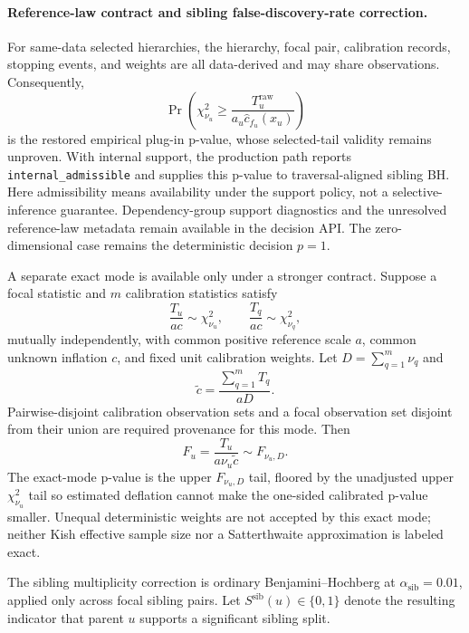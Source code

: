 \paragraph{Reference-law contract and sibling false-discovery-rate correction.}
For same-data selected hierarchies, the hierarchy, focal pair, calibration
records, stopping events, and weights are all data-derived and may share
observations. Consequently,
\begin{equation}
\Pr\!\left(
\chi^2_{\nu_u}
\ge
\frac{T_u^{\mathrm{raw}}}{a_u\hat c_{f_u}(x_u)}
\right)
\end{equation}
is the restored empirical plug-in p-value, whose selected-tail validity remains
unproven. With internal support, the production path reports
\texttt{internal\_admissible} and supplies this p-value to traversal-aligned
sibling BH. Here admissibility means availability under the support policy,
not a selective-inference guarantee. Dependency-group support diagnostics
and the unresolved reference-law metadata remain available in the decision API.
The zero-dimensional case remains the deterministic decision $p=1$.

A separate exact mode is available only under a stronger contract. Suppose a
focal statistic and $m$ calibration statistics satisfy
\[
\frac{T_u}{ac}\sim\chi^2_{\nu_u},
\qquad
\frac{T_q}{ac}\sim\chi^2_{\nu_q},
\]
mutually independently, with common positive reference scale $a$, common
unknown inflation $c$, and fixed unit calibration weights. Let
$D=\sum_{q=1}^m\nu_q$ and
\[
\widetilde c=\frac{\sum_{q=1}^m T_q}{aD}.
\]
Pairwise-disjoint calibration observation sets and a focal observation set
disjoint from their union are required provenance for this mode. Then
\[
F_u=\frac{T_u}{a\nu_u\widetilde c}\sim F_{\nu_u,D}.
\]
The exact-mode p-value is the upper $F_{\nu_u,D}$ tail, floored by the
unadjusted upper $\chi^2_{\nu_u}$ tail so estimated deflation cannot make the
one-sided calibrated p-value smaller. Unequal deterministic weights are not
accepted by this exact mode; neither Kish effective sample size nor a
Satterthwaite approximation is labeled exact.

The sibling multiplicity correction is ordinary
Benjamini--Hochberg \citep{benjamini1995controlling} at
$\alpha_{\mathrm{sib}} = 0.01$, applied only across focal sibling pairs. Let
$S^{\mathrm{sib}}(u) \in \{0,1\}$ denote the resulting indicator that parent
$u$ supports a significant sibling split.
